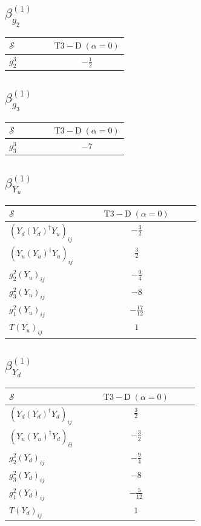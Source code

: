 \documentclass[9pt]{article}
\begin{document}
\subsection*{$ \beta_{g_2}^{(1)} $}
\begin{longtable}{@{}p{0.38\linewidth}c@{}}
\toprule
$\mathcal{S}$ & $ \mathrm{T3-D}\;(\alpha=0) $ \\
\midrule
$ g_2^3 $ & $ - \frac{1}{2} $ \\
\bottomrule
\end{longtable}
\subsection*{$ \beta_{g_3}^{(1)} $}
\begin{longtable}{@{}p{0.38\linewidth}c@{}}
\toprule
$\mathcal{S}$ & $ \mathrm{T3-D}\;(\alpha=0) $ \\
\midrule
$ g_3^3 $ & $ -7 $ \\
\bottomrule
\end{longtable}
\subsection*{$ \beta_{Y_u}^{(1)} $}
\begin{longtable}{@{}p{0.38\linewidth}c@{}}
\toprule
$\mathcal{S}$ & $ \mathrm{T3-D}\;(\alpha=0) $ \\
\midrule
$ (Y_d (Y_d)^{\dagger} Y_u)_{ij} $ & $ - \frac{3}{2} $ \\
$ (Y_u (Y_u)^{\dagger} Y_u)_{ij} $ & $ \frac{3}{2} $ \\
$ g_2^2 (Y_u)_{ij} $ & $ - \frac{9}{4} $ \\
$ g_3^2 (Y_u)_{ij} $ & $ -8 $ \\
$ g_1^2 (Y_u)_{ij} $ & $ - \frac{17}{12} $ \\
$ T (Y_u)_{ij} $ & $ 1 $ \\
\bottomrule
\end{longtable}
\subsection*{$ \beta_{Y_d}^{(1)} $}
\begin{longtable}{@{}p{0.38\linewidth}c@{}}
\toprule
$\mathcal{S}$ & $ \mathrm{T3-D}\;(\alpha=0) $ \\
\midrule
$ (Y_d (Y_d)^{\dagger} Y_d)_{ij} $ & $ \frac{3}{2} $ \\
$ (Y_u (Y_u)^{\dagger} Y_d)_{ij} $ & $ - \frac{3}{2} $ \\
$ g_2^2 (Y_d)_{ij} $ & $ - \frac{9}{4} $ \\
$ g_3^2 (Y_d)_{ij} $ & $ -8 $ \\
$ g_1^2 (Y_d)_{ij} $ & $ - \frac{5}{12} $ \\
$ T (Y_d)_{ij} $ & $ 1 $ \\
\bottomrule
\end{longtable}
\end{document}
